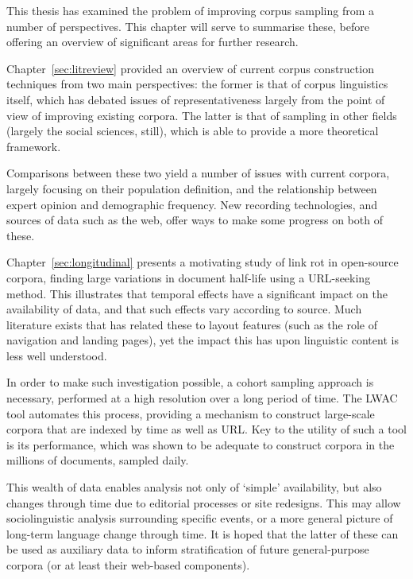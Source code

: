 

This thesis has examined the problem of improving corpus sampling from a number of perspectives.  This chapter will serve to summarise these, before offering an overview of significant areas for further research.

Chapter~\ref{sec:litreview} provided an overview of current corpus construction techniques from two main perspectives: the former is that of corpus linguistics itself, which has debated issues of representativeness largely from the point of view of improving existing corpora.  The latter is that of sampling in other fields (largely the social sciences, still), which is able to provide a more theoretical framework.

Comparisons between these two yield a number of issues with current corpora, largely focusing on their population definition, and the relationship between expert opinion and demographic frequency.  New recording technologies, and sources of data such as the web, offer ways to make some progress on both of these.


Chapter~\ref{sec:longitudinal} presents a motivating study of link rot in open-source corpora, finding large variations in document half-life using a URL-seeking method.  This illustrates that temporal effects have a significant impact on the availability of data, and that such effects vary according to source.  Much literature exists that has related these to layout features (such as the role of navigation and landing pages), yet the impact this has upon linguistic content is less well understood.

In order to make such investigation possible, a cohort sampling approach is necessary, performed at a high resolution over a long period of time.  The LWAC tool automates this process, providing a mechanism to construct large-scale corpora that are indexed by time as well as URL.  Key to the utility of such a tool is its performance, which was shown to be adequate to construct corpora in the millions of documents, sampled daily.

This wealth of data enables analysis not only of `simple' availability, but also changes through time due to editorial processes or site redesigns.  This may allow sociolinguistic analysis surrounding specific events, or a more general picture of long-term language change through time.  It is hoped that the latter of these can be used as auxiliary data to inform stratification of future general-purpose corpora (or at least their web-based components).

